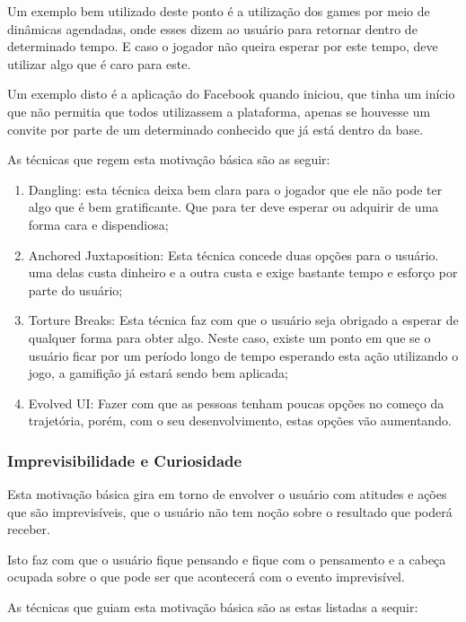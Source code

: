 Um exemplo bem utilizado deste ponto é a utilização dos games por meio de dinâmicas
agendadas, onde esses dizem ao usuário para retornar dentro de determinado tempo.
E caso o jogador não queira esperar por este tempo, deve utilizar algo que é caro
para este.

Um exemplo disto é a aplicação do Facebook quando iniciou, que tinha um início que não permitia
que todos utilizassem a plataforma, apenas se houvesse um convite por parte de um
determinado conhecido que já está dentro da base.

As técnicas que regem esta motivação básica são as seguir:

\begin{enumerate}
    \item Dangling: esta técnica deixa bem clara para o jogador que ele não pode
        ter algo que é bem gratificante. Que para ter deve esperar ou adquirir
        de uma forma cara e dispendiosa;
    \item Anchored Juxtaposition: Esta técnica concede duas opções para o usuário.
        uma delas custa dinheiro e a outra custa e exige bastante tempo e esforço
        por parte do usuário;
    \item Torture Breaks: Esta técnica faz com que o usuário seja obrigado a esperar
        de qualquer forma para obter algo. Neste caso, existe um ponto em que
        se o usuário ficar por um período longo de tempo esperando esta ação
        utilizando o jogo, a gamifição já estará sendo bem aplicada;
    \item Evolved UI: Fazer com que as pessoas tenham poucas opções no começo da
        trajetória, porém, com o seu desenvolvimento, estas opções vão aumentando.
\end{enumerate}

\subsubsection{Imprevisibilidade e Curiosidade}
\label{sub:imprevisibilidadeecuriosidade}
Esta motivação básica gira em torno de envolver o usuário com atitudes e ações que são
imprevisíveis, que o usuário não tem noção sobre o resultado que poderá receber.

Isto faz com que o usuário fique pensando e fique com o pensamento e a cabeça ocupada
sobre o que pode ser que acontecerá com o evento imprevisível.

As técnicas que guiam esta motivação básica são as estas listadas a sequir:

